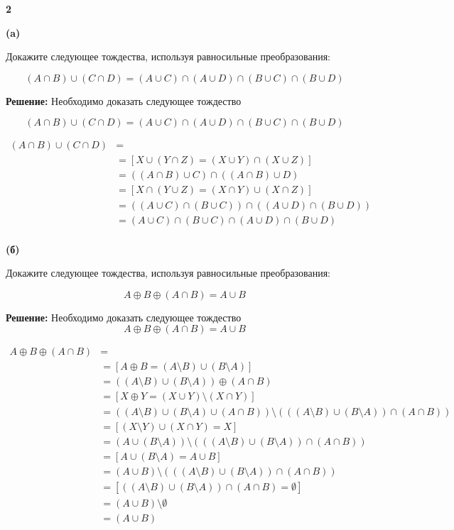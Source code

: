 \documentclass{article}
\begin{document}
\newpage

\textbf{2} 

\textbf{(a)}

Докажите следующее тождества, используя равносильные преобразования:

$$ (A \cap B) \cup (C \cap D) = (A \cup C) \cap (A \cup D) \cap (B \cup C) \cap (B \cup D)$$

\textbf{Решение:}
Необходимо доказать следующее тождество

$$ (A \cap B) \cup (C \cap D) = (A \cup C) \cap (A \cup D) \cap (B \cup C) \cap (B \cup D)$$

\begin{equation} 
\begin{split}
(A \cap B) \cup (C \cap D) & =  \\
 & = [X \cup (Y \cap Z) = (X \cup Y) \cap (X \cup Z)] \\
 & = ((A \cap B) \cup C) \cap ((A \cap B) \cup D) \\
 & = [X \cap (Y \cup Z) = (X \cap Y) \cup (X \cap Z)] \\
 & = ((A \cup C) \cap (B \cup C)) \cap ((A \cup D) \cap (B \cup D)) \\
 & = (A \cup C) \cap (B \cup C) \cap (A \cup D) \cap (B \cup D) \\
\end{split}
\end{equation}

\textbf{(б)}

Докажите следующее тождества, используя равносильные преобразования:

$$ A \oplus B \oplus (A \cap B) = A \cup B$$

\textbf{Решение:}
Необходимо доказать следующее тождество
$$ A \oplus B \oplus (A \cap B) = A \cup B$$

\begin{equation} 
\begin{split}
A \oplus B \oplus (A \cap B) & =  \\
 & = [A \oplus B = (A \setminus B) \cup (B \setminus A)] \\
 & = ((A \setminus B) \cup (B \setminus A)) \oplus (A \cap B) \\
 & = [X \oplus Y = (X \cup Y) \setminus (X \cap Y)] \\
 & = ((A \setminus B) \cup (B \setminus A) \cup (A \cap B)) \setminus (((A \setminus B) \cup (B \setminus A)) \cap (A \cap B)) \\
 & = [(X \setminus Y) \cup (X \cap Y) = X ] \\
 & = (A \cup (B \setminus A)) \setminus (((A \setminus B) \cup (B \setminus A)) \cap (A \cap B)) \\
 & = [A \cup (B \setminus A) =  A \cup B] \\
 & = (A \cup B) \setminus (((A \setminus B) \cup (B \setminus A)) \cap (A \cap B)) \\
 & = [((A \setminus B) \cup (B \setminus A)) \cap (A \cap B) = \emptyset ] \\
 & = (A \cup B) \setminus \emptyset \\
 & = (A \cup B) \\
\end{split}
\end{equation}
\end{document}
